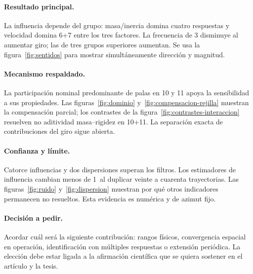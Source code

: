 \documentclass[11pt,a4paper]{article}
\newcommand{\pct}{\text{\char37}}
\begin{document}
\paragraph{Resultado principal.} La influencia depende del grupo: masa/inercia domina cuatro respuestas y velocidad domina 6+7 entre los tres factores. La frecuencia de 3 disminuye al aumentar giro; las de tres grupos superiores aumentan. Se usa la figura~\ref{fig:sentidos} para mostrar simultáneamente dirección y magnitud.
\paragraph{Mecanismo respaldado.} La participación nominal predominante de palas en 10 y 11 apoya la sensibilidad a sus propiedades. Las figuras~\ref{fig:dominio} y~\ref{fig:compensacion-rejilla} muestran la compensación parcial; los contrastes de la figura~\ref{fig:contrastes-interaccion} resuelven no aditividad masa--rigidez en 10+11. La separación exacta de contribuciones del giro sigue abierta.
\paragraph{Confianza y límite.} Catorce influencias y dos dispersiones superan los filtros. Los estimadores de influencia cambian menos de 1\pct\ al duplicar veinte a cuarenta trayectorias. Las figuras~\ref{fig:ruido} y~\ref{fig:dispersion} muestran por qué otros indicadores permanecen no resueltos. Esta evidencia es numérica y de azimut fijo.
\paragraph{Decisión a pedir.} Acordar cuál será la siguiente contribución: rangos físicos, convergencia espacial en operación, identificación con múltiples respuestas o extensión periódica. La elección debe estar ligada a la afirmación científica que se quiera sostener en el artículo y la tesis.

\appendix
\end{document}
